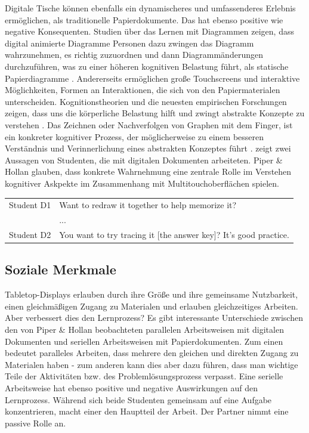 \medskip Digitale Tische können ebenfalls ein dynamischeres und umfassenderes Erlebnis ermöglichen, als traditionelle Papierdokumente. Das hat ebenso positive wie negative Konsequenten. Studien über das Lernen mit Diagrammen zeigen, dass digital animierte Diagramme Personen dazu zwingen das Diagramm wahrzunehmen, es richtig zuzuordnen und dann Diagrammänderungen durchzuführen, was zu einer höheren kognitiven Belastung führt, als statische Papierdiagramme \citep{Price:2002}. Andererseits ermöglichen große Touchscreens und interaktive Möglichkeiten, Formen an Interaktionen, die sich von den Papiermaterialen unterscheiden. Kognitionstheorien und die neuesten empirischen Forschungen zeigen, dass uns die körperliche Belastung hilft und zwingt abstrakte Konzepte zu verstehen \citep{Clark:1996,Johnson:1987,Nunez:1999,Varela:1991}. Das Zeichnen oder Nachverfolgen von Graphen mit dem Finger, ist ein konkreter kognitiver Prozess, der möglicherweise zu einem besseren Verständnis und Verinnerlichung eines abstrakten Konzeptes führt \citep{Goldin:2003}.  zeigt zwei Aussagen von Studenten, die mit digitalen Dokumenten arbeiteten. Piper \& Hollan glauben, dass konkrete Wahrnehmung eine zentrale Rolle im Verstehen kognitiver Askpekte im Zusammenhang mit Multitouchoberflächen spielen. \citep{Piper:2009}

\begin{extract}{
		\myfloatalign
		\begin{tabularx}{\textwidth}{p{2cm}X}
    		Student D1 & Want to redraw it together to help memorize it? \\
			 & ... \\
			Student D2 & You want to try tracing it [the answer key]? It’s good practice. \\
		\end{tabularx}
	}
	\label{ext:piperCognitiveAffordances}
\end{extract}

\subsection{Soziale Merkmale}
Tabletop-Displays erlauben durch ihre Größe und ihre gemeinsame Nutzbarkeit, einen gleichmäßigen Zugang zu Materialen und erlauben gleichzeitiges Arbeiten. Aber verbessert dies den Lernprozess? Es gibt interessante Unterschiede zwischen den von Piper \& Hollan beobachteten parallelen Arbeitsweisen mit digitalen Dokumenten und seriellen Arbeitsweisen mit Papierdokumenten. Zum einen bedeutet paralleles Arbeiten, dass mehrere den gleichen und direkten Zugang zu Materialen haben - zum anderen kann dies aber dazu führen, dass man wichtige Teile der Aktivitäten bzw. des Problemlösungsprozess verpasst. Eine serielle Arbeitsweise hat ebenso positive und negative Auswirkungen auf den Lernprozess. Während sich beide Studenten gemeinsam auf eine Aufgabe konzentrieren, macht einer den Hauptteil der Arbeit. Der Partner nimmt eine passive Rolle an.

